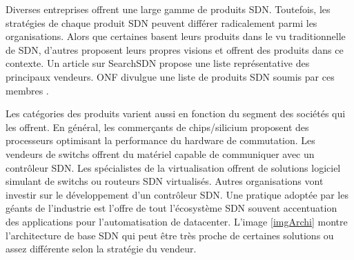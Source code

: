 

Diverses entreprises offrent une large gamme de produits SDN. Toutefois, les stratégies de chaque produit SDN peuvent différer radicalement parmi les organisations. Alors que certaines basent leurs produits dans le vu traditionnelle de SDN, d'autres proposent leurs propres visions et offrent des produits dans ce contexte. Un article sur SearchSDN \cite{42Vendors} propose une liste représentative des principaux vendeurs. ONF divulgue une liste de produits SDN soumis par ces membres \cite{ProductDirectory}.  

Les catégories des produits varient aussi en fonction du segment des sociétés qui les offrent. En général, les commerçants de chips/silicium proposent des processeurs optimisant la performance du hardware de commutation.  Les vendeurs de switchs offrent du matériel capable de communiquer avec un contrôleur SDN. Les spécialistes de la \gls{virtualisation} offrent de solutions logiciel simulant de switchs ou routeurs SDN virtualisés. Autres organisations vont investir sur le développement d'un contrôleur SDN. Une pratique adoptée par les géants de l'industrie est l'offre de tout l'écosystème SDN souvent accentuation des applications pour l'automatisation de \gls{datacenter}.\cite{2013GuideSDNNVEcosystem} L'image \ref{imgArchi} montre l'architecture de base SDN qui peut être très proche de certaines solutions ou assez différente selon la stratégie du vendeur.
 

